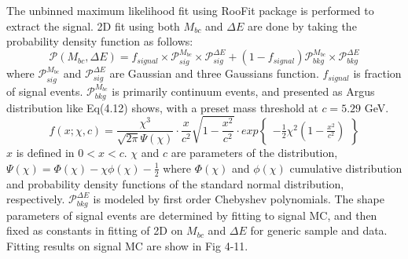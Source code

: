 The unbinned maximum likelihood fit using RooFit package is performed to extract the signal. 2D fit using both $M_{bc}$ and $\Delta{E}$ are done by taking the probability density function as follows: 
\begin{equation}
\mathcal{P}(M_{bc},\Delta{E}) = 
f_{signal}\times \mathcal{P}_{sig}^{M_{bc}}\times\mathcal{P}_{sig}^{\Delta{E}}
+ 
(1-f_{signal})\mathcal{P}_{bkg}^{M_{bc}}\times\mathcal{P}_{bkg}^{\Delta{E}}
\end{equation}
where $\mathcal{P}_{sig}^{M_{bc}}$ and $\mathcal{P}_{sig}^{\Delta{E}}$ are Gaussian and three Gaussians function. $f_{signal}$ is fraction of signal events. $\mathcal{P}_{bkg}^{M_{bc}}$ is  primarily continuum events, and presented as Argus distribution like Eq(4.12) shows, with a preset mass threshold at $c = 5.29$ GeV. 
\begin{equation}
f(x;\chi,c)=\frac{\chi^3}{\sqrt{2\pi}\Psi(\chi)}\cdot
\frac{x}{c^2}\sqrt{1-\frac{x^2}{c^2}}\cdot
exp\begin{Bmatrix}
-\frac{1}{2}\chi^2(1-\frac{x^2}{c^2})
\end{Bmatrix}
\end{equation}
 $x$ is defined in $0<x<c$. $\chi$ and $c$ are parameters of the distribution, $\Psi(\chi)=\Phi(\chi)-\chi\phi(\chi)-\frac{1}{2}$ where $\Phi(\chi)$ and $\phi(\chi)$  cumulative distribution and probability density functions of the standard normal distribution, respectively. 
 $\mathcal{P}_{bkg}^{\Delta{E}}$  is modeled by first order Chebyshev polynomials. The shape parameters of signal events are determined by fitting to signal MC, and  then fixed as constants in fitting of 2D on $M_{bc}$ and $\Delta E$ for generic sample and data. Fitting results on signal MC are show in Fig 4-11. 
 
